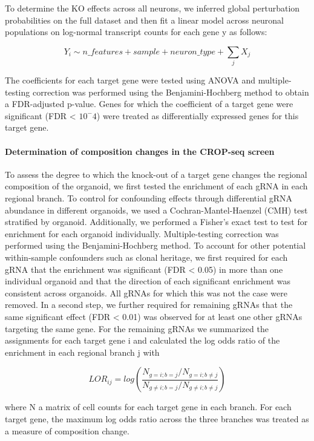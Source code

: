 To determine the KO effects across all neurons, we inferred global perturbation probabilities on the full dataset and then fit a linear model across neuronal populations on log-normal transcript counts for each gene y as follows:
 
\[ Y_i \sim n\_features + sample + neuron\_type + \sum_j X_j \]
 
The coefficients for each target gene were tested using ANOVA and multiple-testing correction was performed using the Benjamini-Hochberg method to obtain a FDR-adjusted p-value. Genes for which the coefficient of a target gene were significant (FDR < $10^-4$) were treated as differentially expressed genes for this target gene.
 
 
\paragraph{Determination of composition changes in the CROP-seq screen}
To assess the degree to which the knock-out of a target gene changes the regional composition of the organoid, we first tested the enrichment of each gRNA in each regional branch. To control for confounding effects through differential gRNA abundance in different organoids, we used a Cochran-Mantel-Haenzel (CMH) test stratified by organoid. Additionally, we performed a Fisher's exact test to test for enrichment for each organoid individually. Multiple-testing correction was performed using the Benjamini-Hochberg method. To account for other potential within-sample confounders such as clonal heritage, we first required for each gRNA that the enrichment was significant (FDR < 0.05) in more than one individual organoid and that the direction of each significant enrichment was consistent across organoids. All gRNAs for which this was not the case were removed. In a second step, we further required for remaining gRNAs that the same significant effect (FDR < 0.01) was observed for at least one other gRNAs targeting the same gene. For the remaining gRNAs we summarized the assignments for each target gene i  and calculated the log odds ratio of the enrichment in each regional branch j with
 
\[ LOR_{ij} = log(\frac{N_{g=i;b=j} / N_{g=i;b\neq j}} {N_{g\neq i;b=j} / N_{g\neq i;b\neq j}} ) \]   
 
where N a matrix of cell counts for each target gene in each branch. For each target gene, the maximum log odds ratio across the three branches was treated as a measure of composition change.
 
